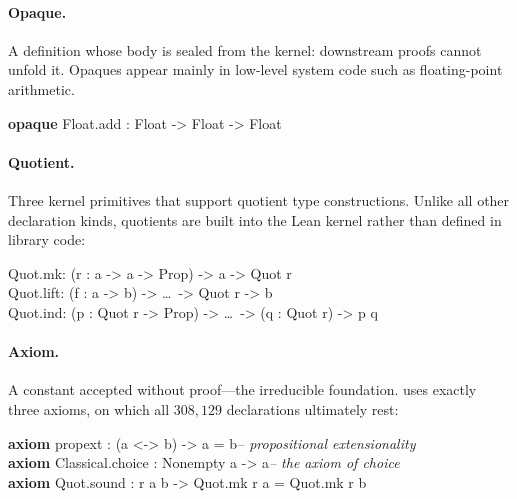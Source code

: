 \paragraph{Opaque.}
A definition whose body is sealed from the kernel: downstream proofs cannot unfold it. Opaques appear mainly in low-level system code such as floating-point arithmetic.

\begin{codebox}
\textbf{opaque} \textcolor{red!70!black}{Float.add} : Float -> Float -> Float
\end{codebox}

\paragraph{Quotient.}
Three kernel primitives that support quotient type constructions. Unlike all other declaration kinds, quotients are built into the Lean kernel rather than defined in library code:

\begin{codebox}
\textcolor{red!70!black}{Quot.mk}\hspace{1.1em}: (r : a -> a -> Prop) -> a -> Quot r\\
\textcolor{red!70!black}{Quot.lift}\hspace{0.3em}: (f : a -> b) -> \ldots\ -> Quot r -> b\\
\textcolor{red!70!black}{Quot.ind}\hspace{0.6em}: (p : Quot r -> Prop) -> \ldots\ -> (q : Quot r) -> p q
\end{codebox}

\paragraph{Axiom.}
A constant accepted without proof---the irreducible foundation.  uses exactly three axioms, on which all $308{,}129$ declarations ultimately rest:

\begin{codebox}
\textbf{axiom} \textcolor{red!70!black}{propext} : (a <-> b) -> a = b\hfill\textit{\color{gray}-- propositional extensionality}\\
\textbf{axiom} \textcolor{red!70!black}{Classical.choice} : Nonempty a -> a\hfill\textit{\color{gray}-- the axiom of choice}\\
\textbf{axiom} \textcolor{red!70!black}{Quot.sound} : r a b -> Quot.mk r a = Quot.mk r b
\end{codebox}

